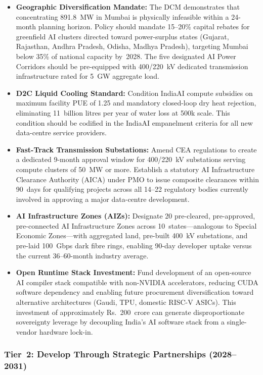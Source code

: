 \documentclass[conference]{IEEEtran}
\begin{document}
\begin{itemize}[leftmargin=*, noitemsep, topsep=2pt]
  \item \textbf{Geographic Diversification Mandate:} The DCM demonstrates that concentrating 891.8~MW in Mumbai is physically infeasible within a 24-month planning horizon. Policy should mandate 15--20\% capital rebates for greenfield AI clusters directed toward power-surplus states (Gujarat, Rajasthan, Andhra Pradesh, Odisha, Madhya Pradesh), targeting Mumbai below 35\% of national capacity by~2028. The five designated AI Power Corridors should be pre-equipped with 400/220~kV dedicated transmission infrastructure rated for 5~GW aggregate load.
  \item \textbf{D2C Liquid Cooling Standard:} Condition IndiaAI compute subsidies on maximum facility PUE of 1.25 and mandatory closed-loop dry heat rejection, eliminating 11~billion litres per year of water loss at 500k scale. This condition should be codified in the IndiaAI empanelment criteria for all new data-centre service providers.
  \item \textbf{Fast-Track Transmission Substations:} Amend CEA regulations to create a dedicated 9-month approval window for 400/220~kV substations serving compute clusters of 50~MW or more. Establish a statutory AI Infrastructure Clearance Authority (AICA) under PMO to issue composite clearances within 90~days for qualifying projects across all 14--22 regulatory bodies currently involved in approving a major data-centre development.
  \item \textbf{AI Infrastructure Zones (AIZs):} Designate 20 pre-cleared, pre-approved, pre-connected AI Infrastructure Zones across 10~states---analogous to Special Economic Zones---with aggregated land, pre-built 400~kV substations, and pre-laid 100~Gbps dark fibre rings, enabling 90-day developer uptake versus the current 36--60-month industry average.
  \item \textbf{Open Runtime Stack Investment:} Fund development of an open-source AI compiler stack compatible with non-NVIDIA accelerators, reducing CUDA software dependency and enabling future procurement diversification toward alternative architectures (Gaudi, TPU, domestic RISC-V ASICs). This investment of approximately Rs.~200~crore can generate disproportionate sovereignty leverage by decoupling India's AI software stack from a single-vendor hardware lock-in.
\end{itemize}

\subsubsection{Tier~2: Develop Through Strategic Partnerships (2028--2031)}
\end{document}
